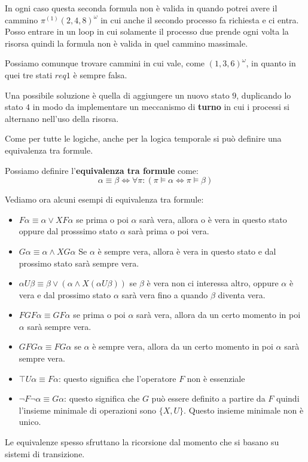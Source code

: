 \begin{esempio}
    In ogni caso questa seconda formula non è valida in quando potrei avere il
    cammino $\pi^{(1)}(2,4,8)^\omega$ in cui anche il secondo processo fa richiesta e
    ci entra. Posso entrare in un loop in cui solamente il processo due prende
    ogni volta la risorsa quindi la formula non è valida in quel cammino massimale.

    Possiamo comunque trovare cammini in cui vale, come $(1,3,6)^\omega$, in
    quanto in quei tre stati $req1$ è sempre falsa.

    Una possibile soluzione è quella di aggiungere un nuovo stato $9$, duplicando
    lo stato $4$ in modo da implementare un meccanismo di \textbf{turno} in cui
    i processi si alternano nell'uso della risorsa.
\end{esempio}
Come per tutte le logiche, anche per la logica temporale si può definire una
equivalenza tra formule.
\begin{definizione}
    Possiamo definire l'\textbf{equivalenza tra formule} come:
    \begin{equation}
        \alpha \equiv \beta \iff \forall \pi : ( \pi \vDash \alpha \iff \pi \vDash \beta)
    \end{equation}
\end{definizione}
\begin{esempio}
    Vediamo ora alcuni esempi di equivalenza tra formule:
    \begin{itemize}
        \item $F\alpha \equiv \alpha \lor XF\alpha$ se prima o poi $\alpha$ sarà
              vera, allora o è vera in questo stato oppure dal prosssimo stato
              $\alpha$ sarà prima o poi vera.
        \item $G\alpha \equiv \alpha \land XG\alpha$ Se $\alpha$  è sempre vera,
              allora è vera in questo stato e dal prossimo stato sarà sempre vera.
        \item $\alpha U \beta \equiv \beta \lor (\alpha \land X(\alpha U \beta))$
              se $\beta$ è vera non ci interessa altro, oppure $\alpha$ è vera e
              dal prossimo stato $\alpha$ sarà vera fino a quando $\beta$ diventa
              vera.
        \item $FGF \alpha \equiv GF\alpha$ se prima o poi $\alpha$ sarà vera, allora
              da un certo momento in poi $\alpha$ sarà sempre vera.
        \item $GFG\alpha \equiv FG\alpha$ se $\alpha$ è sempre vera, allora da un
              certo momento in poi $\alpha$ sarà sempre vera.
        \item $\top U\alpha \equiv F\alpha$: questo significa che l'operatore
              $F$ non è essenziale
        \item $\lnot F \lnot \alpha\equiv G\alpha$: questo significa che $G$ può
              essere definito a partire da $F$ quindi l'insieme minimale di
              operazioni sono $\{X,U\}$. Questo insieme minimale non è unico.
    \end{itemize}
\end{esempio}
Le equivalenze spesso sfruttano la ricorsione dal momento che si basano su sistemi
di transizione.

